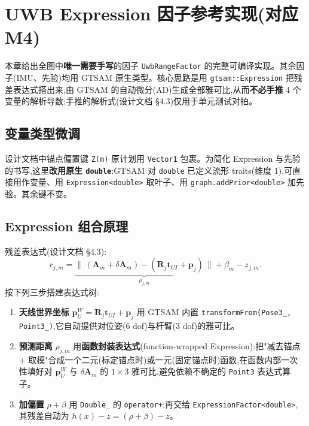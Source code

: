 \documentclass[11pt,a4paper]{report}
\newcommand{\bp}{\bm{p}}
\newcommand{\bv}{\bm{v}}
\newcommand{\bb}{\bm{b}}
\newcommand{\bR}{\bm{R}}
\newcommand{\bT}{\bm{T}}
\newcommand{\bA}{\bm{A}}
\newcommand{\skewop}[1]{\left[#1\right]_{\times}}
\begin{document}

\chapter{UWB Expression 因子参考实现(对应 M4)}

本章给出全图中\textbf{唯一需要手写}的因子 \texttt{UwbRangeFactor} 的完整可编译实现。其余因子(IMU、先验)均用 GTSAM 原生类型。核心思路是用 \texttt{gtsam::Expression} 把残差表达式搭出来,由 GTSAM 的自动微分(AD)生成全部雅可比,从而\textbf{不必手推} 4 个变量的解析导数;手推的解析式(设计文档 \S 4.3)仅用于单元测试对拍。

\section{变量类型微调}
设计文档中锚点偏置键 \texttt{Z(m)} 原计划用 \texttt{Vector1} 包裹。为简化 Expression 与先验的书写,这里\textbf{改用原生 \texttt{double}}:GTSAM 对 \texttt{double} 已定义流形 traits(维度 1),可直接用作变量、用 \texttt{Expression<double>} 取叶子、用 \texttt{graph.addPrior<double>} 加先验。其余键不变。

\section{Expression 组合原理}
残差表达式(设计文档 \S 4.3):
\begin{equation}
r_{j,m} = \underbrace{\big\|\,(\bA_m+\delta\bA_m)-(\bR_j\bm{t}_{UI}+\bp_j)\,\big\|}_{\rho_{j,m}} + \beta_m - z_{j,m}.
\end{equation}
按下列三步搭建表达式树:
\begin{enumerate}[leftmargin=2em]
  \item \textbf{天线世界坐标} $\bp_U^W=\bR_j\bm{t}_{UI}+\bp_j$ 用 GTSAM 内置 \texttt{transformFrom(Pose3\_, Point3\_)},它自动提供对位姿(6 dof)与杆臂(3 dof)的雅可比。
  \item \textbf{预测距离} $\rho_{j,m}$ 用\textbf{函数封装表达式}(function-wrapped Expression):把"减去锚点 + 取模"合成一个二元(标定锚点时)或一元(固定锚点时)函数,在函数内部一次性填好对 $\bp_U^W$ 与 $\delta\bA_m$ 的 $1\times3$ 雅可比,避免依赖不确定的 \texttt{Point3} 表达式算子。
  \item \textbf{加偏置} $\rho+\beta$ 用 \texttt{Double\_} 的 \texttt{operator+};再交给 \texttt{ExpressionFactor<double>},其残差自动为 $h(x)-z=(\rho+\beta)-z$。
\end{enumerate}
\end{document}
